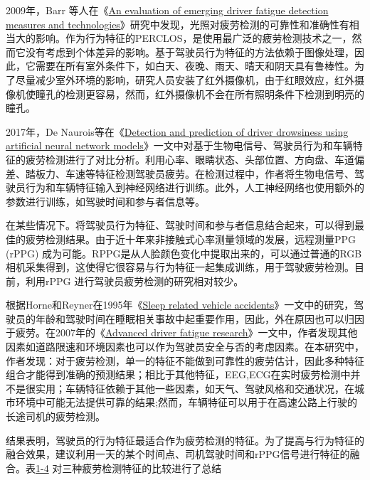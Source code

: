 2009年，Barr 等人在《\href{https://xueshu.baidu.com/usercenter/paper/show?paperid=aded0de3ebb58d07e23230c62153fce6&site=xueshu_se}{An evaluation of emerging driver fatigue detection measures and technologies}》研究中发现，光照对疲劳检测的可靠性和准确性有相当大的影响。作为行为特征的PERCLOS，是使用最广泛的疲劳检测技术之一，然而它没有考虑到个体差异的影响。基于驾驶员行为特征的方法依赖于图像处理，因此，它需要在所有室外条件下，如白天、夜晚、雨天、晴天和阴天具有鲁棒性。为了尽量减少室外环境的影响，研究人员安装了红外摄像机，由于红眼效应，红外摄像机使瞳孔的检测更容易，然而，红外摄像机不会在所有照明条件下检测到明亮的瞳孔。

2017年，De Naurois等在《\href{https://xueshu.baidu.com/usercenter/paper/show?paperid=76bb81fc6b65675fa178861a1109e741&site=xueshu_se&hitarticle=1}{Detection and prediction of driver drowsiness using artificial neural network models}》一文中对基于生物电信号、驾驶员行为和车辆特征的疲劳检测进行了对比分析。利用心率、眼睛状态、头部位置、方向盘、车道偏差、踏板力、车速等特征检测驾驶员疲劳。在检测过程中，作者将生物电信号、驾驶员行为和车辆特征输入到神经网络进行训练。此外，人工神经网络也使用额外的参数进行训练，如驾驶时间和参与者信息等。

在某些情况下。将驾驶员行为特征、驾驶时间和参与者信息结合起来，可以得到最佳的疲劳检测结果。由于近十年来非接触式心率测量领域的发展，远程测量PPG (rPPG) 成为可能。RPPG是从人脸颜色变化中提取出来的，可以通过普通的RGB相机采集得到，这使得它很容易与行为特征一起集成训练，用于驾驶疲劳检测。目前，利用rPPG 进行驾驶员疲劳检测的研究相对较少。

根据Horne和Reyner在1995年《\href{https://xueshu.baidu.com/usercenter/paper/show?paperid=3848bbb16ac092c9224bd450fb80436c&site=xueshu_se}{Sleep related vehicle accidents}》一文中的研究，驾驶员的年龄和驾驶时间在睡眠相关事故中起重要作用，因此，外在原因也可以归因于疲劳。在2007年的《\href{https://xueshu.baidu.com/usercenter/paper/show?paperid=ab695119186c9f9bdd1a9144ca287d43&site=xueshu_se}{Advanced driver fatigue research}》一文中，作者发现其他因素如道路限速和环境因素也可以作为驾驶员安全与否的考虑因素。在本研究中，作者发现：对于疲劳检测，单一的特征不能做到可靠性的疲劳估计，因此多种特征组合才能得到准确的预测结果；相比于其他特征，EEG,ECG在实时疲劳检测中并不是很实用；车辆特征依赖于其他一些因素，如天气、驾驶风格和交通状况，在城市环境中可能无法提供可靠的结果;然而，车辆特征可以用于在高速公路上行驶的长途司机的疲劳检测。

结果表明，驾驶员的行为特征最适合作为疲劳检测的特征。为了提高与行为特征的融合效果，建议利用一天的某个时间点、司机驾驶时间和rPPG信号进行特征的融合。表\href{table:1-4}{1-4} 对三种疲劳检测特征的比较进行了总结

